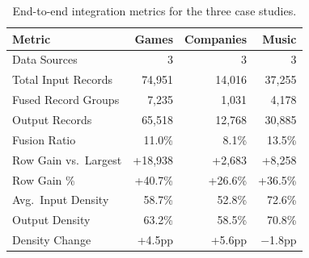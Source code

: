 
\begin{table}[t]
\caption{End-to-end integration metrics for the three case studies.}
\label{tab:e2e_metrics}
\centering
\begin{tabular}{@{}lrrr@{}}
\toprule
\textbf{Metric} & \textbf{Games} & \textbf{Companies} & \textbf{Music} \\
\midrule
Data Sources & 3 & 3 & 3 \\
Total Input Records & 74,951 & 14,016 & 37,255 \\
Fused Record Groups & 7,235 & 1,031 & 4,178 \\
Output Records & 65,518 & 12,768 & 30,885 \\
Fusion Ratio & 11.0\% & 8.1\% & 13.5\% \\
\midrule
Row Gain vs.\ Largest & +18,938 & +2,683 & +8,258 \\
Row Gain \% & +40.7\% & +26.6\% & +36.5\% \\
\midrule
Avg.\ Input Density & 58.7\% & 52.8\% & 72.6\% \\
Output Density & 63.2\% & 58.5\% & 70.8\% \\
Density Change & +4.5pp & +5.6pp & $-$1.8pp \\
\bottomrule
\end{tabular}
\end{table}
